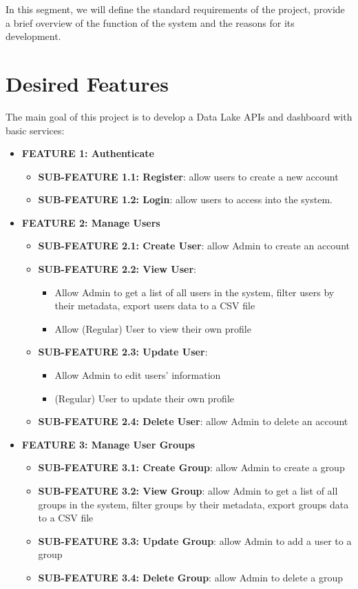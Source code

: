 In this segment, we will define the standard requirements of the project, provide a brief overview of the function of the system and the reasons for its development.
\section{Desired Features}
The main goal of this project is to develop a Data Lake APIs and dashboard with basic services: 
\begin{itemize}
    \item \textbf{FEATURE 1: Authenticate}
    \begin{itemize}
        \item \textbf{SUB-FEATURE 1.1: Register}: allow users to create a new account
        \item \textbf{SUB-FEATURE 1.2: Login}: allow users to access into the system.
    \end{itemize}
    
    \item \textbf{FEATURE 2: Manage Users}
    \begin{itemize}
        \item \textbf{SUB-FEATURE 2.1: Create User}: allow Admin to create an account
        \item \textbf{SUB-FEATURE 2.2: View User}: 
            \begin{itemize}
                \item Allow Admin to get a list of all users in the system, filter users by their metadata, export users data to a CSV file
                \item Allow (Regular) User to view their own profile
            \end{itemize}
        \item \textbf{SUB-FEATURE 2.3: Update User}: 
            \begin{itemize}
                \item Allow Admin to edit users' information
                \item (Regular) User to update their own profile
            \end{itemize}
        \item \textbf{SUB-FEATURE 2.4: Delete User}: allow Admin to delete an account     
    \end{itemize}
    
    \item \textbf{FEATURE 3: Manage User Groups}
    \begin{itemize}
        \item \textbf{SUB-FEATURE 3.1: Create Group}: allow Admin to create a group
        \item \textbf{SUB-FEATURE 3.2: View Group}: allow Admin to get a list of all groups in the system, filter groups by their metadata, export groups data to a CSV file
        \item \textbf{SUB-FEATURE 3.3: Update Group}: allow Admin to add a user to a group
        \item \textbf{SUB-FEATURE 3.4: Delete Group}: allow Admin to delete a group
    \end{itemize}
    

\end{itemize}
